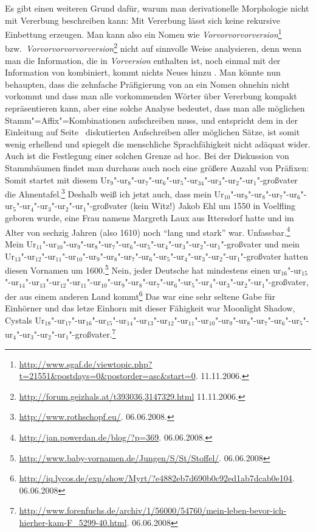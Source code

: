 Es gibt einen weiteren Grund dafür, warum man derivationelle Morphologie nicht mit Vererbung beschreiben kann:
Mit Vererbung lässt sich keine rekursive Einbettung erzeugen. Man kann also ein Nomen wie
\emph{Vorvorvorvorversion}\footnote{%
   \url{http://www.sgaf.de/viewtopic.php?t=21551&postdays=0&postorder=asc&start=0}. 11.11.2006.%
} bzw.\ \emph{Vorvorvorvorvorversion}\footnote{%
  \url{http://forum.geizhals.at/t393036,3147329.html} 11.11.2006.%
}
nicht auf sinnvolle Weise analysieren, denn wenn man die Information, die in \emph{Vorversion} enthalten
ist, noch einmal mit der Information von  kombiniert, kommt nichts Neues hinzu
\citep[]{KN93a}.
Man könnte nun behaupten, dass die zehnfache Präfigierung von
 an ein Nomen ohnehin nicht vorkommt und dass man alle vorkommenden Wörter über Vererbung
kompakt repräsentieren kann, aber eine solche Analyse bedeutet, dass
man alle möglichen Stamm"=Affix"=Kombinationen aufschreiben muss, und entspricht dem in der Einleitung 
auf Seite~\pageref{Seite-Alle-Sätze-aufschreiben}
diskutierten Aufschreiben aller möglichen Sätze, ist somit wenig erhellend und spiegelt die
menschliche Sprachfähigkeit nicht adäquat wider. Auch ist die Festlegung einer solchen Grenze ad
hoc. Bei der Diskussion von Stammbäumen findet man durchaus auch noch eine größere Anzahl von
Präfixen:
\eal
\ex Somit startet mit diesem Ur$_9$"-ur$_8$"-ur$_7$"-ur$_6$"-ur$_5$"-ur$_34$"-ur$_3$"-ur$_2$"-ur$_1$"-großvater die Ahnentafel.\footnote{
  \url{http://www.rothschopf.eu/}. 06.06.2008.
}
\ex Deshalb weiß ich jetzt auch, dass mein Ur$_{10}$"-ur$_9$"-ur$_8$"-ur$_7$"-ur$_6$"-ur$_5$"-ur$_4$"-ur$_3$"-ur$_2$"-ur$_1$"-großvater (kein Witz!) Jakob Ehl um
1550 in Voelfling geboren wurde, eine Frau namens Margreth Laux aus Ittersdorf hatte und im Alter
von sechzig Jahren (also 1610) noch "`lang und stark"' war. Unfassbar.\footnote{
  \url{http://jan.powerdan.de/blog/?p=369}. 06.06.2008.
}
\ex Mein Ur$_{11}$"-ur$_{10}$"-ur$_9$"-ur$_8$"-ur$_7$"-ur$_6$"-ur$_5$"-ur$_4$"-ur$_3$"-ur$_2$"-ur$_1$"-großvater und mein Ur$_{13}$"-ur$_{12}$"-ur$_{11}$"-ur$_{10}$"-ur$_9$"-ur$_8$"-ur$_7$"-ur$_6$"-ur$_5$"-ur$_4$"-ur$_3$"-ur$_2$"-ur$_1$"-großvater hatten diesen
Vornamen um 1600.\footnote{
  \url{http://www.baby-vornamen.de/Jungen/S/St/Stoffel/}. 06.06.2008
}
\ex Nein, jeder Deutsche hat mindestens einen
ur$_{16}$"-ur$_{15}$"-ur$_{14}$"-ur$_{13}$"-ur$_{12}$"-ur$_{11}$"-ur$_{10}$"-ur$_9$"-ur$_8$"-ur$_7$"-ur$_6$"-ur$_5$"-ur$_4$"-ur$_3$"-ur$_2$"-ur$_1$"-großvater,
der aus einem anderen Land kommt\footnote{
  \url{http://iq.lycos.de/exp/show/Myrt/?e4882eb7d690b0c92ed1ab7dcab0e104}. 06.06.2008
}
\ex Das war eine sehr seltene Gabe für Einhörner und das letze Einhorn mit dieser Fähigkeit war
Moonlight Shadow, Cystals Ur$_{18}$"-ur$_{17}$"-ur$_{16}$"-ur$_{15}$"-ur$_{14}$"-ur$_{13}$"-ur$_{12}$"-ur$_{11}$"-ur$_{10}$"-ur$_{9}$"-ur$_{8}$"-ur$_{7}$"-ur$_{6}$"-ur$_{5}$"-ur$_{4}$"-ur$_{3}$"-ur$_{2}$"-ur$_{1}$"-großvater.\footnote{
\url{http://www.forenfuchs.de/archiv/1/56000/54760/mein-leben-bevor-ich-hierher-kam-F_5299-40.html}.
06.06.2008
}
\zl

